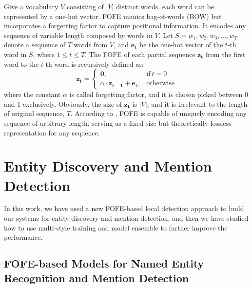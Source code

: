 \documentclass[11pt]{article}
\begin{document}
Give a vocabulary $V$ consisting of $|V|$ distinct words, each word can be represented by a one-hot vector. 
FOFE mimics bag-of-words (BOW) but incorporates a forgetting factor to capture positional information.
It encodes any sequence of variable length composed by words in $V$. 
Let $S = {w_1, w_2, w_3, ... , w_T}$ denote a sequence of $T$ words from $V$, 
and $\bm{e_t}$ be the one-hot vector of the $t$-th word in $S$, where $1 \leq t \leq T$.
The FOFE of each partial sequence $\bm{z_t}$ from the first word to the $t$-th word is recursively defined as:
\begin{equation}
\bm{z_t}=
\begin{cases}
\bm{0}, & \text{if}\ t = 0 \\
\alpha \cdot \bm{z_{t - 1}} + \bm{e_t}, & \text{otherwise}
\end{cases}  \label{eq_FOFE_formula}
\end{equation}
where the constant $\alpha$ is called forgetting factor, and it is chosen picked between $0$ and $1$ exclusively. 
Obviously, the size of $\bm{z_t}$ is $|V|$, and it is irrelevant to the length of original sequence, $T$.
According to \cite{zhang2015fixed}, FOFE is capable of uniquely encoding any sequence of arbitrary length, serving as a fixed-size but theoretically lossless representation for any sequence.

\section{Entity Discovery and Mention Detection}

In this work, we have used a new FOFE-based local detection approach to build our systems for 
entity discovery and mention detection, and then we have studied how to use multi-style training and model ensemble to further improve the performance. 

\subsection{FOFE-based Models for Named Entity Recognition and Mention Detection}
\end{document}

